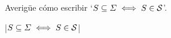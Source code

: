 

\bigskip

\enunciadoS Averig\"ue c\'omo escribir 
`$ S \subseteq {\mit \Sigma} \iff S \in {\cal S} $'.

\bigskip

\respuestaS |$ S \subseteq {\mit \Sigma} \iff S \in {\cal S} $|
\bye

